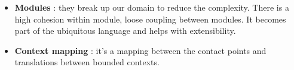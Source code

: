 \documentclass[11pt]{article}
\begin{document}
\begin{appendix}
\begin{itemize}
\item \textbf{Modules} : they break up our domain to reduce the complexity. There is a high cohesion within module, loose coupling between modules. It becomes part of the ubiquitous language and helps with extensibility.
\item \textbf{Context mapping} : it's a mapping between the contact points and translations between bounded contexts.
\end{itemize}
\end{appendix}
\end{document}
